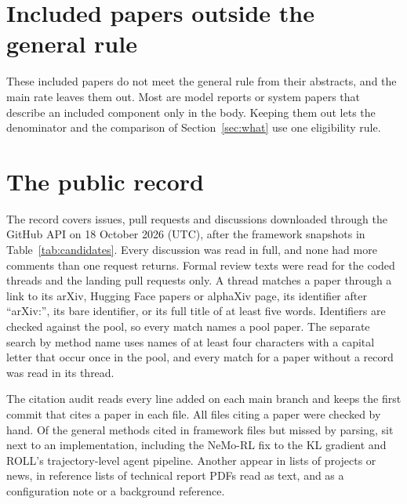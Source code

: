 \documentclass{article}
\begin{document}
\section{Included papers outside the general rule}
\label{app:exceptions}

These \NExceptions{} included papers do not meet the general rule from their abstracts, and the main rate leaves them out. Most are model reports or system papers that describe an included component only in the body. Keeping them out lets the denominator and the comparison of Section~\ref{sec:what} use one eligibility rule.

\begin{table}[!htbp]
\centering
\small
\caption{\textbf{Included papers that do not meet the general rule from their abstracts.} The attribution of masked importance sampling stays open among near-simultaneous sources.}
\label{tab:exceptions}

\end{table}

\section{The public record}
\label{app:record}

The record covers \NThreads{} issues, pull requests and discussions downloaded through the GitHub API on 18 October 2026 (UTC), after the framework snapshots in Table~\ref{tab:candidates}. Every discussion was read in full, and none had more comments than one request returns. Formal review texts were read for the coded threads and the landing pull requests only. A thread matches a paper through a link to its arXiv, Hugging Face papers or alphaXiv page, its identifier after ``arXiv:'', its bare identifier, or its full title of at least five words. Identifiers are checked against the pool, so every match names a pool paper. The separate search by method name uses names of at least four characters with a capital letter that occur once in the pool, and every match for a paper without a record was read in its thread.

The citation audit reads every line added on each main branch and keeps the first commit that cites a paper in each file. All files citing a paper were checked by hand. Of the \NAuditUnmatched{} general methods cited in framework files but missed by parsing, \NAuditAdded{} sit next to an implementation, including the NeMo-RL fix to the KL gradient and ROLL's trajectory-level agent pipeline. Another \NAuditList{} appear in lists of projects or news, \NAuditReport{} in reference lists of technical report PDFs read as text, and \NAuditOther{} as a configuration note or a background reference.
\end{document}

